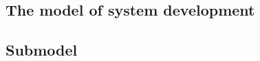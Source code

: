 \documentclass[xlevel, hyperref, nat, mp, en]{wise}
\begin{document}
\begin{appendix}  
  \listoffigures

  \listoftables

  \listofabbreviations


  
  
  \begin{appendices}
  \section{The model of system development}
  \newpage
  \subsection{Submodel}

  \end{appendices}
  \declaration
\end{appendix}
\end{document}
